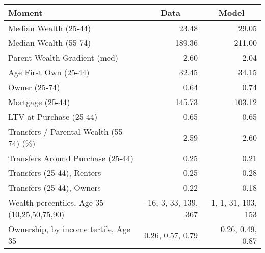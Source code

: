\begin{tabular}{lrr}
\toprule
\multicolumn{1}{l}{Moment} & \multicolumn{1}{c}{Data} & \multicolumn{1}{c}{Model}\\
\midrule
Median Wealth (25-44) & 23.48 & 29.05\\
Median Wealth (55-74) & 189.36 & 211.00\\
Parent Wealth Gradient (med) & 2.60 & 2.04\\
Age First Own (25-44) & 32.45 & 34.15\\
Owner (25-74) & 0.64 & 0.74\\
Mortgage (25-44) & 145.73 & 103.12\\
LTV at Purchase (25-44) & 0.65 & 0.65\\
Transfers / Parental Wealth (55-74) (\%) & 2.59 & 2.60\\
Transfers Around Purchase (25-44) & 0.25 & 0.21\\
Transfers (25-44), Renters & 0.25 & 0.28\\
Transfers (25-44), Owners & 0.22 & 0.18\\
Wealth percentiles, Age 35 (10,25,50,75,90) & -16, 3, 33, 139, 367 & 1, 1, 31, 103, 153  \\ 
Ownership, by income tertile, Age 35 & 0.26, 0.57, 0.79 & 0.26, 0.49, 0.87  \\ 
\bottomrule
\end{tabular}
